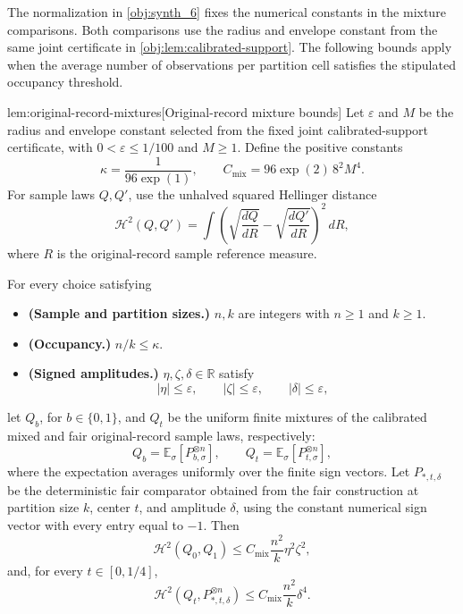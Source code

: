 \documentclass[11pt]{article}
\begin{document}
The normalization in \cref{obj:synth_6} fixes the numerical constants in the mixture comparisons. Both comparisons use the radius and envelope constant from the same joint certificate in \cref{obj:lem:calibrated-support}. The following bounds apply when the average number of observations per partition cell satisfies the stipulated occupancy threshold.

\begin{lemmav}{lem:original-record-mixtures}[Original-record mixture bounds]
Let \(\varepsilon\) and \(M\) be the radius and envelope constant selected from the fixed joint calibrated-support certificate, with \(0<\varepsilon\le 1/100\) and \(M\ge 1\). Define the positive constants
\[
\kappa=\frac{1}{96\exp(1)},
\qquad
C_{\mathrm{mix}}=96\exp(2)\,8^2M^4.
\]
For sample laws \(Q,Q'\), use the unhalved squared Hellinger distance
\[
\mathcal H^2(Q,Q')
=
\int
\left(
\sqrt{\frac{dQ}{dR}}-
\sqrt{\frac{dQ'}{dR}}
\right)^2\,dR,
\]
where \(R\) is the original-record sample reference measure.

For every choice satisfying
\begin{itemize}
\item \textbf{(Sample and partition sizes.)} \(n,k\) are integers with \(n\ge 1\) and \(k\ge 1\).
\item \textbf{(Occupancy.)} \(n/k\le\kappa\).
\item \textbf{(Signed amplitudes.)} \(\eta,\zeta,\delta\in\mathbb R\) satisfy
\[
|\eta|\le\varepsilon,\qquad
|\zeta|\le\varepsilon,\qquad
|\delta|\le\varepsilon,
\]
\end{itemize}
let \(Q_b\), for \(b\in\{0,1\}\), and \(Q_t\) be the uniform finite mixtures of the calibrated mixed and fair original-record sample laws, respectively:
\[
Q_b=\mathbb E_\sigma\!\left[P_{b,\sigma}^{\otimes n}\right],
\qquad
Q_t=\mathbb E_\sigma\!\left[P_{t,\sigma}^{\otimes n}\right],
\]
where the expectation averages uniformly over the finite sign vectors. Let \(P_{*,t,\delta}\) be the deterministic fair comparator obtained from the fair construction at partition size \(k\), center \(t\), and amplitude \(\delta\), using the constant numerical sign vector with every entry equal to \( -1 \). Then
\[
\mathcal H^2(Q_0,Q_1)
\le
C_{\mathrm{mix}}\frac{n^2}{k}\eta^2\zeta^2,
\]
and, for every \(t\in[0,1/4]\),
\[
\mathcal H^2\!\left(Q_t,P_{*,t,\delta}^{\otimes n}\right)
\le
C_{\mathrm{mix}}\frac{n^2}{k}\delta^4.
\]
\end{lemmav}
\end{document}
